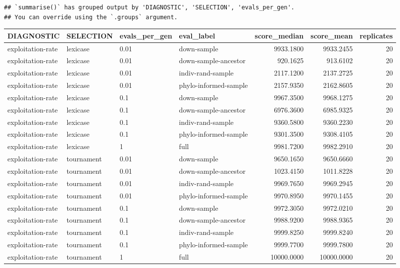 \documentclass[
]{book}
\begin{document}
\begin{lstlisting}
## `summarise()` has grouped output by 'DIAGNOSTIC', 'SELECTION', 'evals_per_gen'.
## You can override using the `.groups` argument.
\end{lstlisting}

\begin{tabular}{l|l|l|l|r|r|r}
\hline
DIAGNOSTIC & SELECTION & evals\_per\_gen & eval\_label & score\_median & score\_mean & replicates\\
\hline
exploitation-rate & lexicase & 0.01 & down-sample & 9933.1800 & 9933.2455 & 20\\
\hline
exploitation-rate & lexicase & 0.01 & down-sample-ancestor & 920.1625 & 913.6102 & 20\\
\hline
exploitation-rate & lexicase & 0.01 & indiv-rand-sample & 2117.1200 & 2137.2725 & 20\\
\hline
exploitation-rate & lexicase & 0.01 & phylo-informed-sample & 2157.9350 & 2162.8605 & 20\\
\hline
exploitation-rate & lexicase & 0.1 & down-sample & 9967.3500 & 9968.1275 & 20\\
\hline
exploitation-rate & lexicase & 0.1 & down-sample-ancestor & 6976.3600 & 6985.9325 & 20\\
\hline
exploitation-rate & lexicase & 0.1 & indiv-rand-sample & 9360.5800 & 9360.2230 & 20\\
\hline
exploitation-rate & lexicase & 0.1 & phylo-informed-sample & 9301.3500 & 9308.4105 & 20\\
\hline
exploitation-rate & lexicase & 1 & full & 9981.7200 & 9982.2910 & 20\\
\hline
exploitation-rate & tournament & 0.01 & down-sample & 9650.1650 & 9650.6660 & 20\\
\hline
exploitation-rate & tournament & 0.01 & down-sample-ancestor & 1023.4150 & 1011.8228 & 20\\
\hline
exploitation-rate & tournament & 0.01 & indiv-rand-sample & 9969.7650 & 9969.2945 & 20\\
\hline
exploitation-rate & tournament & 0.01 & phylo-informed-sample & 9970.8950 & 9970.1455 & 20\\
\hline
exploitation-rate & tournament & 0.1 & down-sample & 9972.3050 & 9972.0210 & 20\\
\hline
exploitation-rate & tournament & 0.1 & down-sample-ancestor & 9988.9200 & 9988.9365 & 20\\
\hline
exploitation-rate & tournament & 0.1 & indiv-rand-sample & 9999.8250 & 9999.8240 & 20\\
\hline
exploitation-rate & tournament & 0.1 & phylo-informed-sample & 9999.7700 & 9999.7800 & 20\\
\hline
exploitation-rate & tournament & 1 & full & 10000.0000 & 10000.0000 & 20\\
\hline
\end{tabular}
\end{document}
